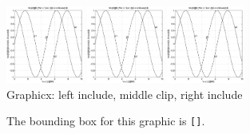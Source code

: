 \documentclass{article}
\begin{document}
\parbox{\linewidth}{%
\begin{center}
\includegraphics[width=1in]{graphics/example}
\includegraphics[width=1in,clip]{graphics/example}
\includegraphics[width=1in]{graphics/example}\\[1ex]
\textsf{Graphicx}: left include, middle clip, right include
\end{center}}

The bounding box for this graphic is \texttt{[]}.
\end{document}
